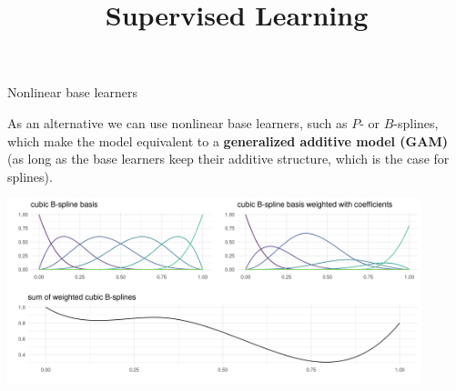 \documentclass[11pt,compress,t,notes=noshow, xcolor=table]{beamer}
\title{Supervised Learning}
\date{}
\begin{document}


\begin{vbframe}{Nonlinear base learners}

As an alternative we can use nonlinear base learners, such as $P$- or
$B$-splines, which make the model equivalent to a
\textbf{generalized additive model (GAM)} (as long as the base learners keep
their additive structure, which is the case for splines).
\vspace{0.5cm}

\vfill

\begin{center}
\includegraphics[width=0.9\textwidth]{figure/bspline-basis.png}
\end{center}

%

\end{vbframe}




%
%
%
\end{document}
